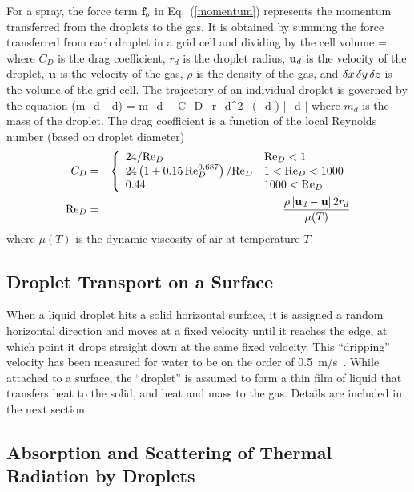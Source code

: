 \documentclass[11pt]{book}
\begin{document}
For a spray, the force term ${\bf f}_b$ in Eq.~(\ref{momentum})
represents the momentum transferred from the droplets to the gas.
It is obtained by summing the force transferred from each droplet
in a grid cell and dividing by the cell volume
 = \ha {}
    {\dx \, \dy \, \dz} \ee
where $C_D$ is the drag coefficient, $r_d$ is the droplet radius,
${\bf u}_d$ is the velocity of the droplet, ${\bf u}$ is the
velocity of the gas, $\rho$ is the density of the gas,
and $\delta x \, \delta y \, \delta z$ is the volume of the grid cell.
The trajectory of an individual droplet is governed by the equation
\be {} (m_d \bu_d) = m_d\, \bg - \ha \rho\,C_D \, \pi  r_d^2 \,
    (\bu_d-\bu) |\bu_d-\bu| \ee
where $m_d$ is the mass of the droplet.
The drag coefficient is a function of the local Reynolds number (based on droplet diameter)
\begin{eqnarray}
 C_D &=& \left\{ \begin{array}{ll}
     24/\hbox{Re}_D                                       & \hbox{Re}_D < 1    \\
     24\left(1+0.15 \, \hbox{Re}_D^{0.687} \right)/\hbox{Re}_D  & 1 < \hbox{Re}_D < 1000 \\
     0.44                                           & 1000 < \hbox{Re}_D
     \end{array} \right.  \\
\hbox{Re}_D &=& \frac{\rho \, |{\bf u}_d-{\bf u}| \, 2 r_d}{\mu(T)} \end{eqnarray}
where $\mu(T)$ is the dynamic viscosity of air at temperature $T$.



\subsection{Droplet Transport on a Surface}

When a liquid droplet hits a solid horizontal surface, it is assigned a
random horizontal direction and moves at a fixed velocity until it
reaches the edge, at which point it drops straight down at the same
fixed velocity. This ``dripping'' velocity has been measured for water to be on
the order of 0.5~m/s~\cite{Hamins:1,Hamins:IAFSS2002}. While attached to a surface, the ``droplet'' is assumed to form a thin film of liquid that transfers heat to the solid, and heat and mass to
the gas. Details are included in the next section.



\subsection{Absorption and Scattering of Thermal Radiation by Droplets}
\end{document}
